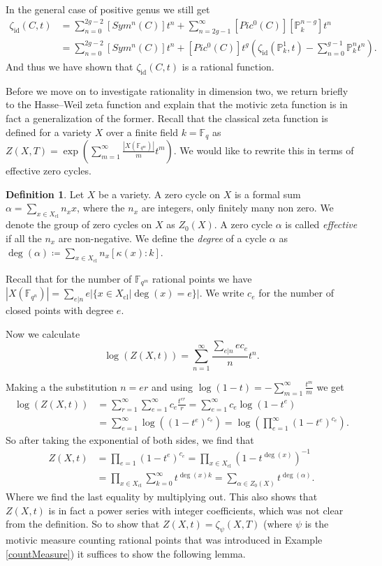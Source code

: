 \documentclass[11pt, a4paper, german, twoside]{article}
\theoremstyle{plain}
\theoremstyle{definition}
\newtheorem{definition}[theorem]{Definition}
\begin{document}
In the general case of positive genus we still get
\begin{align*}
    \zeta_{\mathrm{id}}(C,t) &= \sum_{n=0}^{2g-2} [Sym^n(C)]t^n + \sum_{n=2g-1}^\infty [Pic^0(C)][\mathbb{P}_k^{n-g}]t^n\\
    &= \sum_{n=0}^{2g-2} [Sym^n(C)]t^n + [Pic^0(C)]t^g(\zeta_{\mathrm{id}}(\mathbb{P}_k^1, t) - \sum_{n=0}^{g-1} \mathbb{P}_k^nt^n).
\end{align*}
And thus we have shown that $\zeta_{\mathrm{id}}(C,t)$ is a rational function.

Before we move on to investigate rationality in dimension two, we return briefly to the Hasse--Weil zeta function and explain that the 
motivic zeta function is in fact a generalization of the former.
Recall that the classical zeta function is defined for a variety $X$ over a finite field $k = \mathbb{F}_q$ as 
$Z(X,T) = \exp\left(\sum_{m=1}^\infty \frac{|X(\mathbb{F}_{q^m})|}{m}t^m\right)$. We would like to rewrite this in terms of effective zero cycles.
\begin{definition}
    Let $X$ be a variety. A zero cycle on $X$ is a formal sum $\alpha = \sum_{x \in X_\mathrm{cl}} n_x x$, where the $n_x$ are integers,
    only finitely many non zero. We denote the group of zero cycles on $X$ as $Z_0(X)$. A zero cycle $\alpha$ is called
    \emph{effective} if all the $n_x$ are non-negative. We define the \emph{degree} of a cycle $\alpha$ as 
    $\deg(\alpha) \coloneqq \sum_{x \in X_{\mathrm{cl}}} n_x [\kappa(x):k]$.
\end{definition}

Recall that for the number of $\mathbb{F}_{q^m}$ rational points we have
$|X(\mathbb{F}_{q^n})| = \sum_{e | n} e|\{x \in X_{\mathrm{cl}} | \deg(x) = e\}|$. We write $c_e$ for the number of closed points with degree $e$.

Now we calculate
\[
\log(Z(X,t)) = \sum_{n=1}^\infty \frac{\sum_{e | n} ec_e}{n} t^n.
\]

Making a the substitution $n = er$ and using $\log(1-t) = - \sum_{m=1}^\infty \frac{t^m}{m}$ we get 
\begin{align*}
    \log(Z(X,t)) &= \sum_{r=1}^\infty \sum_{e=1}^\infty c_e \frac{t^{er}}{r} = \sum_{e=1}^\infty c_e \log(1-t^e) \\
                 &= \sum_{e=1}^\infty \log ( (1-t^e)^{c_e} ) = \log(\prod_{e=1}^\infty (1-t^e)^{c_e}).
\end{align*}
So after taking the exponential of both sides, we find that
\begin{align*}
    Z(X,t) &= \prod_{e=1} (1-t^e)^{c_e} = \prod_{x \in X_{\mathrm{cl}}} (1-t^{\deg(x)})^{-1}\\
           &= \prod_{x \in X_{\mathrm{cl}}} \sum_{k=0}^\infty t^{\deg(x)k} = \sum_{\alpha \in Z_0(X)} t^{\deg(\alpha)}.
\end{align*}
Where we find the last equality by multiplying out. This also shows that $Z(X,t)$ is in fact a power series with integer coefficients, which
was not clear from the definition.
So to show that $Z(X,t) = \zeta_{\psi}(X,T)$ 
(where $\psi$ is the motivic measure counting rational points that was introduced in Example \ref{countMeasure}) 
it suffices to show the following lemma.
\end{document}
